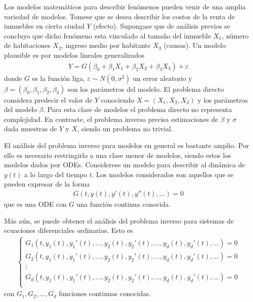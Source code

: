 Los modelos matemáticos para describir fenómenos pueden venir de una amplia variedad de modelos. Tomese que se desea describir los costos de la renta de inmuebles en cierta ciudad $Y$ (efecto). Supongase que de análisis previos se concluyo que dicho fenómeno esta vinculado al tamaño del inmueble $X_1$, número de habitaciones $X_2$, ingreso medio por habitante $X_3$ (causas). Un modelo plausible es por modelos lineales generalizados
\begin{align}
    Y = G(\beta_0 + \beta_1 X_1 + \beta_2 X_2 + \beta_3 X_3) + \varepsilon
    \label{2.1.1.01}
\end{align}
donde $G$ es la función liga, $\varepsilon \sim N(0,\sigma^2)$ un error aleatorio y $\beta = (\beta_0, \beta_1, \beta_2, \beta_3)$ son los parámetros del modelo. El problema directo considera predecir el valor de $Y$ conociendo $X = (X_1,X_2,X_3)$ y los parámetros del modelo $\beta$. Para esta clase de modelos el problema directo no representa complejidad. En contraste, el problema inverso precisa estimaciones de $\beta$  y $\sigma$ dada muestras de $Y$ y $X$, siendo un problema no trivial. 

El análisis del problema inverso para modelos en general es bastante amplio. Por ello es necesario restringirlo a una clase menor de modelos, siendo estos los modelos dados por ODEs. Considerese un modelo para describir al dinámica de $y(t)$ a lo largo del tiempo $t$. Los modelos considerados son aquellos que se pueden expresar de la forma
\begin{align*}
    G(t,y(t),y'(t),y''(t),...) = 0
\end{align*}
que es una ODE con $G$ una función continua conocida.

Más aún, se puede obtener el análisis del problema inverso para sistemas de ecuaciones diferenciales ordinarias. Esto es
\begin{align*}
    \left\{
        \begin{matrix}
        G_1(t,y_1(t),y_1'(t),...,y_2(t),y_2'(t),..., y_d(t),y_d'(t),...)=0\\
        G_2(t,y_1(t),y_1'(t),...,y_2(t),y_2'(t),..., y_d(t),y_d'(t),...)=0\\
        \vdots
        \\ 
        G_d(t,y_1(t),y_1'(t),...,y_2(t),y_2'(t),..., y_d(t),y_d'(t),...)=0\\
       \end{matrix}
    \right.
\end{align*}
con $G_1, G_2, ..., G_d$ funciones continuas conocidas.

